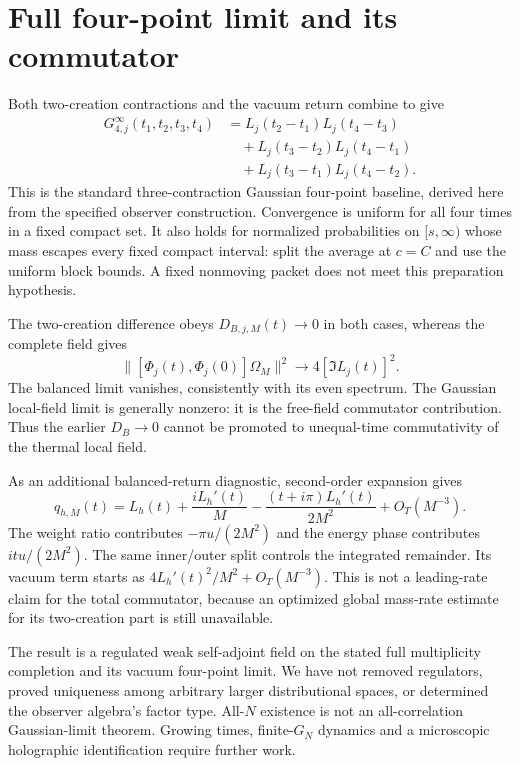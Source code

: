 \documentclass[11pt,a4paper]{article}
\begin{document}
\newpage
\section{Full four-point limit and its commutator}
Both two-creation contractions and the vacuum return combine to give
\begin{align}
 G_{4,j}^{\infty}(t_1,t_2,t_3,t_4)
 &=L_j(t_2-t_1)L_j(t_4-t_3)\nonumber\\
 &\quad+L_j(t_3-t_2)L_j(t_4-t_1)\nonumber\\
 &\quad+L_j(t_3-t_1)L_j(t_4-t_2).
 \label{Wick}
\end{align}
This is the standard three-contraction Gaussian four-point baseline,
derived here from the specified observer construction.
Convergence is uniform for all four times in a fixed compact set.
It also holds for normalized probabilities on $[s,\infty)$ whose mass
escapes every fixed compact interval: split the average at $c=C$ and
use the uniform block bounds. A fixed nonmoving packet does not meet
this preparation hypothesis.

The two-creation difference obeys $D_{B,j,M}(t)\to0$ in both cases,
whereas the complete field gives
\begin{equation}
 \|[\Phi_j(t),\Phi_j(0)]\Omega_M\|^2
       \longrightarrow4[\Im L_j(t)]^2.
 \label{commfree}
\end{equation}
The balanced limit vanishes, consistently with its even spectrum.
The Gaussian local-field limit is generally nonzero: it is the
free-field commutator contribution.
Thus the earlier $D_B\to0$ cannot be promoted to unequal-time
commutativity of the thermal local field.

As an additional balanced-return diagnostic, second-order expansion gives
\begin{equation}
 q_{h,M}(t)=L_h(t)+\frac{iL_h'(t)}M
                -\frac{(t+i\pi)L_h'(t)}{2M^2}+O_T(M^{-3}).
 \label{second}
\end{equation}
The weight ratio contributes $-\pi u/(2M^2)$ and the energy phase
contributes $itu/(2M^2)$. The same inner/outer split controls the
integrated remainder. Its vacuum term starts as
$4L_h'(t)^2/M^2+O_T(M^{-3})$.
This is not a leading-rate claim for the total commutator, because
an optimized global mass-rate estimate for its two-creation part
is still unavailable.

The result is a regulated weak self-adjoint field on the stated full
multiplicity completion and its vacuum four-point limit.
We have not removed regulators, proved uniqueness among arbitrary
larger distributional spaces, or determined the observer algebra's
factor type. All-$N$ existence is not an all-correlation Gaussian-limit
theorem. Growing times, finite-$G_N$ dynamics and a microscopic
holographic identification require further work.
\end{document}
